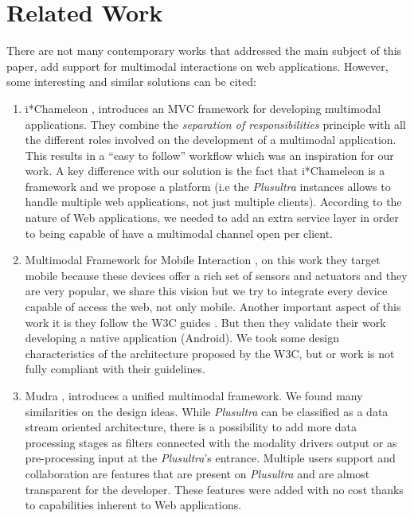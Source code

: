 \documentclass{llncs}
\begin{document}
\section{Related Work}
There are not many contemporary works that addressed the main subject of this paper, add support for multimodal interactions on web applications. However, some interesting and similar solutions can be cited:
\begin{enumerate}

\item i*Chameleon \cite{lo2013chameleon}, introduces an MVC framework for developing multimodal applications. They combine the \emph{separation of responsibilities} principle with all the different roles involved on the development of a multimodal application. This results in a ``easy to follow'' workflow which was an inspiration for our work. A key difference with our solution is the fact that i*Chameleon is a framework and we propose a platform (i.e the \emph{Plusultra} instances allows to handle multiple web applications, not just multiple clients). According to the nature of Web applications, we needed to add an extra service layer in order to being capable of have a multimodal channel open per client.

\item Multimodal Framework for Mobile Interaction \cite{cutugno2012multimodal}, on this work they target mobile because these devices offer a rich set of sensors and actuators and they are very popular, we share this vision but we try to integrate every device capable of access the web, not only mobile. Another important aspect of this work it is they follow the W3C guides \cite{w3c:mmiframework} \cite{w3c:mmiarch}. But then they validate their work developing a native application (Android). We took some design characteristics of the architecture proposed by the W3C, but or work is not fully compliant with their guidelines.

\item Mudra \cite{Hoste2011}, introduces a unified multimodal framework. We found many similarities on the design ideas. While \emph{Plusultra} can be classified as a data stream oriented architecture, there is a possibility to add more data processing stages as filters connected with the modality drivers output or as pre-processing input at the \emph{Plusultra}'s entrance. Multiple users support and collaboration are features that are present on \emph{Plusultra} and are almost transparent for the developer. These features were added with no cost thanks to capabilities inherent to Web applications.
\end{enumerate}
\end{document}
